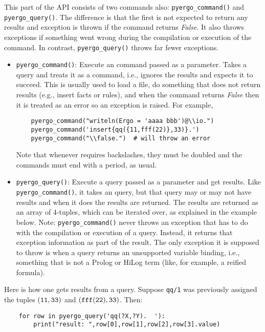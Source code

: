 This part of the 
API consists of two commands also: \texttt{pyergo\_command()} and
\texttt{pyergo\_query()}. The difference is that the first is not expected
to return any results and exception is thrown if the command returns
\emph{False}. It also throws exceptions if something went wrong during the
compilation or execution of the command. In contrast,
\texttt{pyergo\_query()} throws far fewer exceptions.
\begin{itemize}
\item  \texttt{pyergo\_command()}: Execute an \ERGO command passed as a
  parameter. Takes a
  query and treats it as a command, i.e., ignores the results and expects
  it to succeed. This is
  usually used to load a file, do something that does not return results
  (e.g., insert facts or rules),
  and when the command returns \emph{False} then it is treated as an error
  so an exception is raised. For example,
\begin{verbatim}
    pyergo_command("writeln(Ergo = 'aaaa bbb')@\\io.")
    pyergo_command('insert{qq({11,fff(22)},33)}.')  
    pyergo_command("\\false.")  # will throw an error
\end{verbatim}
  Note that whenever \ERGO requires backslashes, they must be doubled and
  the commands must end with a period, as usual.
\item \texttt{pyergo\_query()}: Execute a query passed as a parameter
  and get results.
  Like \texttt{pyergo\_command()}, it takes an \ERGO query, but that
  query may or may not have results and when it does the results are returned.
  The results are returned as an array of 4-tuples, which can be iterated
  over, as explained in the example below.
  Note: \texttt{pyergo\_command()} never throws an exception that has to
  do with the compilation or execution of a query. Instead, it
  returns that exception information as part of the result.
  The only exception it is supposed to throw is when a query returns
  an unsupported variable binding, i.e., something that is not a Prolog or
  HiLog term (like, for example, a reified formula).
\end{itemize}
Here is how one gets results from a query. Suppose \texttt{qq/1}  was previously
assigned the tuples $\tt(11,33)$ and $\tt(fff(22),33)$. Then:
\begin{verbatim}
    for row in pyergo_query('qq(?X,?Y).  '):
        print("result: ",row[0],row[1],row[2],row[3].value)
\end{verbatim}
